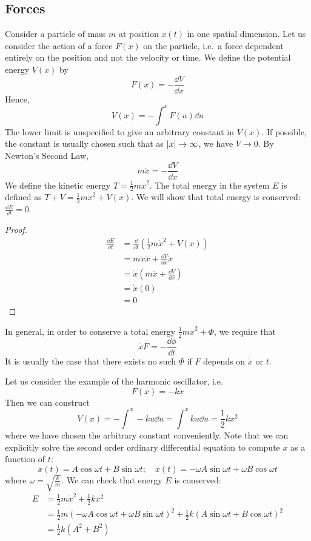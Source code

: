 \subsection{Forces}
Consider a particle of mass \(m\) at position \(x(t)\) in one spatial dimension.
Let us consider the action of a force \(F(x)\) on the particle, i.e.\ a force dependent entirely on the position and not the velocity or time.
We define the potential energy \(V(x)\) by
\[
	F(x) = -\frac{\dd{V}}{\dd{x}}
\]
Hence,
\[
	V(x) = - \int^x F(u) \dd{u}
\]
The lower limit is unspecified to give an arbitrary constant in \(V(x)\).
If possible, the constant is usually chosen such that as \(\abs{x} \to \infty\), we have \(V \to 0\).
By Newton's Second Law,
\[
	m\ddot{x} = -\frac{\dd{V}}{\dd{x}}
\]
We define the kinetic energy \(T = \frac{1}{2}m\dot x^2\).
The total energy in the system \(E\) is defined as \(T + V = \frac{1}{2} m \dot x^2 + V(x)\).
We will show that total energy is conserved: \(\frac{\dd{E}}{\dd{t}} = 0\).
\begin{proof}
	\begin{align*}
		\frac{\dd{E}}{\dd{t}} & = \frac{\dd}{\dd{t}}\left( \frac{1}{2}m\dot x^2 + V(x) \right) \\
		                      & = m\dot x \ddot x + \frac{\dd{V}}{\dd{x}} \dot x               \\
		                      & = \dot x\left( m \ddot x + \frac{\dd{V}}{\dd{x}} \right)       \\
		                      & = \dot x ( 0 )                                                 \\
		                      & = 0
	\end{align*}
\end{proof}
In general, in order to conserve a total energy \(\frac{1}{2}m\dot x^2 + \Phi\), we require that
\[
	\dot x F = -\frac{\dd{\phi}}{\dd{t}}
\]
It is usually the case that there exists no such \(\Phi\) if \(F\) depends on \(\dot x\) or \(t\).

\begin{example}
Let us consider the example of the harmonic oscillator, i.e.
\[
	F(x) = -kx
\]
Then we can construct
\[
	V(x) = -\int^x -ku \dd{u} = \int^x ku \dd{u} = \frac{1}{2} kx^2
\]
where we have chosen the arbitrary constant conveniently.
Note that we can explicitly solve the second order ordinary differential equation to compute \(x\) as a function of \(t\):
\[
	x(t) = A\cos \omega t + B\sin \omega t;\quad \dot x(t) = -\omega A \sin \omega t + \omega B \cos \omega t
\]
where \(\omega = \sqrt{\frac{k}{m}}\).
We can check that energy \(E\) is conserved:
\begin{align*}
	E & = \frac{1}{2}m\dot x^2 + \frac{1}{2}kx^2                                                                                                         \\
	  & = \frac{1}{2}m \left( -\omega A \cos \omega t + \omega B \sin \omega t \right)^2 + \frac{1}{2}k \left( A\sin \omega t + B\cos \omega t \right)^2 \\
	  & = \frac{1}{2}k(A^2 + B^2)
\end{align*}
\end{example}

